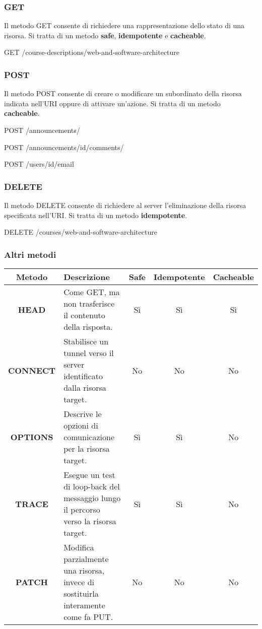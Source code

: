 \documentclass[12pt]{article}
\begin{document}
\subsubsection{GET}
Il metodo GET consente di richiedere una rappresentazione dello stato di una risorsa.
Si tratta di un metodo \textbf{safe}, \textbf{idempotente} e \textbf{cacheable}.
\begin{code}[language=HTTP]
  GET /course-descriptions/web-and-software-architecture
\end{code}

\subsubsection{POST}
Il metodo POST consente di creare o modificare un subordinato della risorsa indicata nell'URI oppure di attivare un'azione.
Si tratta di un metodo \textbf{cacheable}.
\begin{code}[language=HTTP]
  POST /announcements/
\end{code}
\begin{code}[language=HTTP]
  POST /announcements/{id}/comments/
\end{code}
\begin{code}[language=HTTP]
  POST /users/{id}/email
\end{code}

\subsubsection{DELETE}
Il metodo DELETE consente di richiedere al server l'eliminazione della risorsa specificata nell'URI.
Si tratta di un metodo \textbf{idempotente}.
\begin{code}[language=HTTP]
  DELETE /courses/web-and-software-architecture
\end{code}

\subsubsection{Altri metodi}
\begin{center}
\begin{tabularx}{\textwidth}{ |c|X|c|c|c| }
\hline
\textbf{Metodo} & \textbf{Descrizione} & \textbf{Safe} & \textbf{Idempotente} & \textbf{Cacheable}\\
\hline\hline
\textbf{HEAD} & Come GET, ma non trasferisce il contenuto della risposta. & Sì & Sì & Sì\\
\hline
\textbf{CONNECT} & Stabilisce un tunnel verso il server identificato dalla risorsa target. & No & No & No\\
\hline
\textbf{OPTIONS} & Descrive le opzioni di comunicazione per la risorsa target. & Sì & Sì & No\\
\hline
\textbf{TRACE} & Esegue un test di loop-back del messaggio lungo il percorso verso la risorsa target. & Sì & Sì & No\\
\hline
\textbf{PATCH} & Modifica parzialmente una risorsa, invece di sostituirla interamente come fa PUT. & No & No & No\\
\hline
\end{tabularx}
\end{center}
\end{document}
